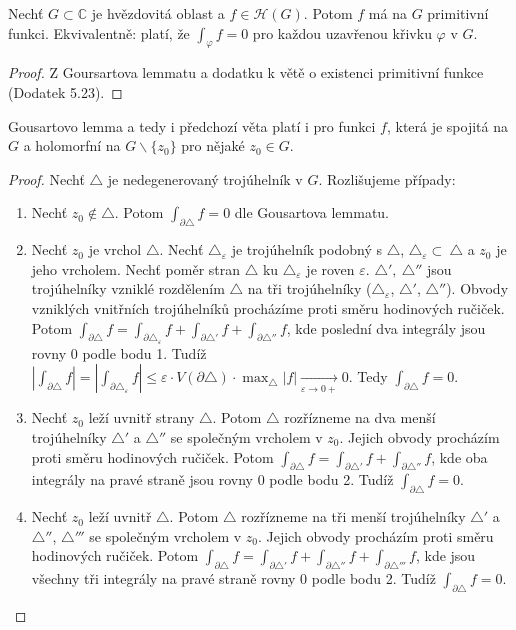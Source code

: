 \newpage
\begin{theorem}
Nechť $G \subset \mathbb{C}$ je hvězdovitá oblast a  $f \in \mathcal{H}(G)$. Potom $f$ má na $G$ primitivní funkci. Ekvivalentně: platí, že $\int_\varphi f=0$ pro každou uzavřenou křivku $\varphi$ v $G$.
\end{theorem}

\begin{proof}
Z Goursartova lemmatu a dodatku k větě o existenci primitivní funkce (Dodatek 5.23).
\end{proof}

\begin{note} %
Gousartovo lemma a tedy i předchozí věta platí i pro funkci $f$, která je spojitá na $G$ a holomorfní na $G \backslash \{z_0\}$ pro nějaké $z_0 \in G$.
\end{note}

\begin{proof}
Nechť $\triangle$ je nedegenerovaný trojúhelník v $G$. Rozlišujeme případy:
\begin{enumerate}
    \item Nechť $z_0 \notin \triangle$. Potom $\int_{\partial\triangle}f=0$ dle Gousartova lemmatu.
    \item Nechť $z_0$ je vrchol $\triangle$. Nechť $\triangle_\varepsilon$ je trojúhelník podobný s $\triangle$, $\triangle_\varepsilon\subset\ \triangle$
    a
    $z_{0}$ je jeho
    vrcholem. Nechť poměr stran $\triangle$ ku 
    $\triangle_\varepsilon$ je
    roven $\varepsilon$. $\triangle',\ \triangle''$ jsou trojúhelníky vzniklé rozdělením $\triangle$ na tři trojúhelníky ($\triangle_\varepsilon$, $\triangle'$, $\triangle''$). Obvody vzniklých vnitřních trojúhelníků procházíme proti směru hodinových ručiček.
    Potom $\int_{\partial\triangle}f=\int_{\partial\triangle_\varepsilon}f+\int_{\partial\triangle'}f+\int_{\partial\triangle''}f$, kde poslední dva integrály jsou rovny $0$ podle bodu 1. Tudíž $|\int_{\partial\triangle}f|=|\int_{\partial\triangle_\varepsilon}f| \le \varepsilon \cdot V(\partial\triangle) \cdot \max_\triangle |f| \xrightarrow[\varepsilon \rightarrow 0+]{}0$. Tedy  $\int_{\partial\triangle} f=0$.
    \item Nechť $z_0$ leží uvnitř strany $\triangle$. Potom $\triangle$ rozřízneme na dva menší trojúhelníky $\triangle'$ a $\triangle''$ se společným vrcholem v $z_{0}$. Jejich obvody procházím proti směru hodinových ručiček. Potom $\int_{\partial\triangle}f=\int_{\partial\triangle'}f+\int_{\partial\triangle''}f$, kde oba integrály na pravé straně jsou rovny $0$ podle bodu 2. Tudíž $\int_{\partial\triangle}f=0$.
    \item Nechť $z_0$ leží uvnitř $\triangle$. Potom $\triangle$ rozřízneme na tři menší trojúhelníky $\triangle'$ a $\triangle''$, $\triangle'''$ se společným vrcholem v $z_{0}$. Jejich obvody procházím proti směru hodinových ručiček. Potom $\int_{\partial\triangle}f=\int_{\partial\triangle'}f+\int_{\partial\triangle''}f+\int_{\partial\triangle'''}f$, kde jsou všechny tři integrály na pravé straně rovny $0$ podle bodu 2. Tudíž $\int_{\partial\triangle}f=0$.
\end{enumerate}
\end{proof}

